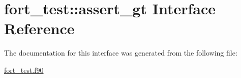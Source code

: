 \hypertarget{interfacefort__test_1_1assert__gt}{}\section{fort\+\_\+test\+:\+:assert\+\_\+gt Interface Reference}
\label{interfacefort__test_1_1assert__gt}


The documentation for this interface was generated from the following file\+:\begin{DoxyCompactItemize}
\item 
\hyperlink{fort__test_8f90}{fort\+\_\+test.\+f90}\end{DoxyCompactItemize}
